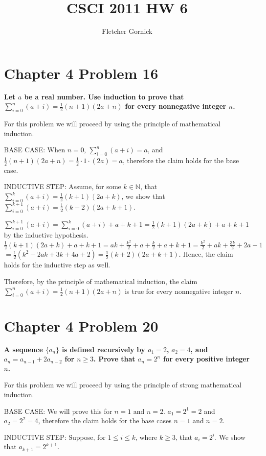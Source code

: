 \documentclass[10pt]{article}
\title{CSCI 2011 HW 6}
\author{Fletcher Gornick}
\def \n {\par \vspace{\baselineskip}}
\begin{document}
\maketitle

\section{Chapter 4 Problem 16}
\textbf{Let $a$ be a real number.  Use induction to prove that $\sum_{i=0}^{n} (a + i) = \frac12 (n + 1)(2a + n)$
for every nonnegative integer $n$.}

For this problem we will proceed by using the principle of mathematical induction.

\n BASE CASE: When $n = 0$, $\sum_{i=0}^{n} (a + i) = a$, and $\frac12(n + 1)(2a + n) = \frac12 \cdot 1 \cdot (2a) = a$, therefore the 
claim holds for the base case.

\n INDUCTIVE STEP: Assume, for some $k \in \mathbb{N}$, that $\sum_{i=0}^{k} (a + i) = \frac12 (k + 1)(2a + k)$, we show that 
$\sum_{i=0}^{k + 1} (a + i) = \frac12 (k + 2)(2a + k + 1)$. 

\n $\sum_{i=0}^{k + 1} (a + i) = \sum_{i=0}^{k} (a + i) + a + k + 1 = \frac12 (k + 1)(2a + k) + a + k + 1$ by the inductive hypothesis.
$\frac12 (k + 1)(2a + k) + a + k + 1 = ak + \frac{k^2}2 + a + \frac{k}{2} + a + k + 1 = \frac{k^2}2 + ak + \frac{3k}{2} + 2a + 1$
$ = \frac12(k^2 + 2ak + 3k + 4a + 2) = \frac12(k + 2)(2a + k + 1)$.  Hence, the claim holds for the inductive step as well.

\n Therefore, by the principle of mathematical induction, the claim $\sum_{i=0}^{n} (a + i) = \frac12 (n + 1)(2a + n)$ is true for every 
nonnegative integer $n$.



\section{Chapter 4 Problem 20}
\textbf{A sequence $\{a_n\}$ is defined recursively by $a_1 = 2$, $a_2 = 4$, and $a_n = a_{n-1} + 2a_{n-2}$ for $n \geq 3$.
Prove that $a_n = 2^n$ for every positive integer $n$.}

For this problem we will proceed by using the principle of strong mathematical induction. 

\n BASE CASE: We will prove this for $n = 1$ and $n = 2$.  $a_1 = 2^1 = 2$ and $a_2 = 2^2 = 4$, therefore the claim holds for the base 
cases $n = 1$ and $n = 2$.

\n INDUCTIVE STEP: Suppose, for $1 \leq i \leq k$, where $k \geq 3$, that $a_i = 2^i$.  We show that $a_{k + 1} = 2^{k + 1}$.
\end{document}
